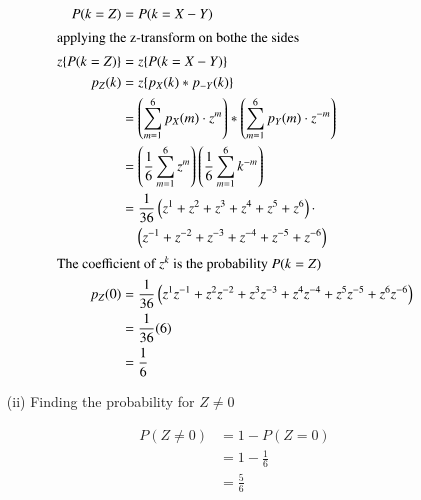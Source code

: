 \documentclass[journal,12pt,twocolumn]{IEEEtran}
\theoremstyle{remark}
\begin{document}
\begin{align}
	P(k=Z) &= P(k=X-Y)\\
	\intertext{applying the z-transform on bothe the sides}
	z\{P(k=Z)\} &= z\{P(k=X-Y)\}\\
	p_Z(k) &= z\{p_X(k)*p_{-Y}(k)\}\\
	&= \left(\sum^6_{m=1}p_X(m)\cdot z^m\right)*\left(\sum^6_{m=1}p_Y(m)\cdot z^{-m}\right)\\
	&= \left(\frac{1}{6}\sum^6_{m=1}z^m\right)\left(\frac{1}{6}\sum^6_{m=1}k^{-m}\right)\\
	&= \frac{1}{36}\left(z^1+z^2+z^3+z^4+z^5+z^6\right)\cdot\nonumber \\&\quad\left(z^{-1}+z^{-2}+z^{-3}+z^{-4}+z^{-5}+z^{-6}\right)\\
	\intertext{The coefficient of $z^k$ is the probability $P(k=Z)$}
	p_Z(0) &= \frac{1}{36}\left(z^1z^{-1} + z^2z^{-2} + z^3z^{-3} + z^4z^{-4} + z^5z^{-5} + z^6z^{-6}\right)\\
	&= \frac{1}{36}(6)\\
	&= \frac{1}{6}
\end{align}
\begin{enumerate}
\item[(ii)] Finding the probability for $Z \neq 0$
\end{enumerate}
\begin{align}
	P(Z \neq 0) &= 1-P(Z=0)\\
	&= 1-\frac{1}{6}\\
	&= \frac{5}{6}
\end{align}
\end{document}
